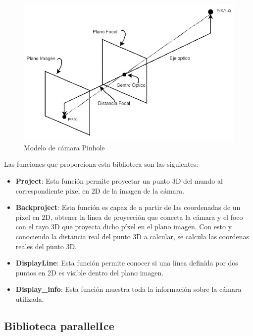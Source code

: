 \begin{figure}[th]
\centering
\includegraphics[scale=0.5]{Figures/pinhole-model.jpg}
\decoRule
\caption[Modelo \textit{Pinhole}]{Modelo de cámara Pinhole}
\label{fig:Pinhole}
\end{figure}

Las funciones que proporciona esta biblioteca son las siguientes:

\begin{itemize}
\item \textbf{Project}: Esta función permite proyectar un punto 3D del mundo al correspondiente pixel en 2D de la imagen de la cámara. 

\item \textbf{Backproject}: Esta función es capaz de a partir de las coordenadas de un píxel en 2D, obtener la línea de proyección que conecta la cámara y el foco con el rayo 3D que proyecta dicho píxel en el plano imagen. Con esto y conociendo la distancia real del punto 3D a calcular, se calcula las coordenas reales del punto 3D.

\item \textbf{DisplayLine}: Esta función permite conocer si una línea definida por dos puntos en 2D es visible dentro del plano imagen. 

\item \textbf{Display\_info}: Esta función muestra toda la información sobre la cámara utilizada.

\end{itemize}

\subsection{Biblioteca parallelIce}

